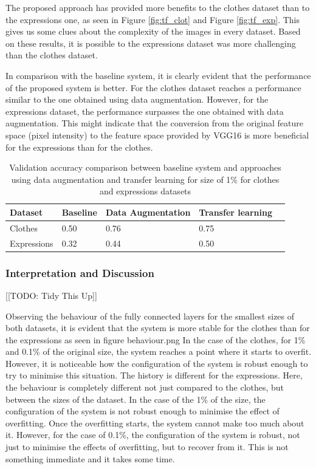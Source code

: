 \documentclass{article}
\begin{document}
The proposed approach has provided more benefits to the clothes dataset than to the expressions one, as seen in Figure \ref{fig:tf_clot} and Figure \ref{fig:tf_exp}. This gives us some clues about the complexity of the images in every dataset. Based on these results, it is possible to the expressions dataset was more challenging than the clothes dataset. 

In comparison with the baseline system, it is clearly evident that the performance of the proposed system is better. For the clothes dataset reaches a performance similar to the one obtained using data augmentation. However, for the expressions dataset, the performance surpasses the one obtained with data augmentation. This might indicate that the conversion from the original feature space (pixel intensity) to the feature space provided by VGG16 is more beneficial for the expressions than for the clothes.

\begin{table}[!htb]
  \centering
  \begin{tabular}{| l | l | l | l | l |}
    \hline
    \textbf{Dataset} & \textbf{Baseline} & \textbf{Data Augmentation}& \textbf{Transfer learning} \\ \hline
    Clothes & 0.50 & 0.76 & 0.75 \\ \hline
    Expressions & 0.32  & 0.44 & 0.50 \\ \hline
  \end{tabular}
  \caption{Validation accuracy comparison between baseline system and approaches using data augmentation and transfer learning for size of 1\% for clothes and expressions datasets}
  \label{tab:tf_2}
\end{table}

\subsubsection{\textbf{Interpretation and Discussion}}

[[TODO: Tidy This Up]]

Observing the behaviour of the fully connected layers for the smallest sizes of both datasets, it is evident that the system is more stable for the clothes than for the expressions as seen in figure behaviour.png In the case of the clothes, for 1\% and 0.1\% of the original size, the system reaches a point where it starts to overfit. However, it is noticeable how the configuration of the system is robust enough to try to minimise this situation. The history is different for the expressions. Here, the behaviour is completely different not just compared to the clothes, but between the sizes of the dataset. In the case of the 1\% of the size, the configuration of the system is not robust enough to minimise the effect of overfitting. Once the overfitting starts, the system cannot make too much about it. However, for the case of 0.1\%, the configuration of the system is robust, not just to minimise the effects of overfitting, but to recover from it. This is not something immediate and it takes some time.
\end{document}
